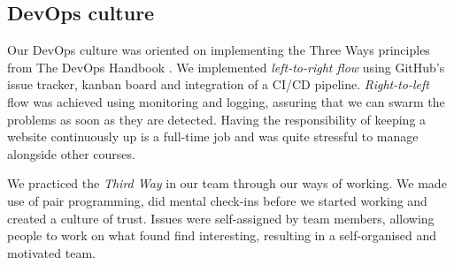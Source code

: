 \subsection{DevOps culture}


Our DevOps culture was oriented on implementing the Three Ways principles from The DevOps Handbook \cite[Chapter~1]{kim2021devops}. We implemented \textit{left-to-right flow} using GitHub's issue tracker, kanban board and integration of a CI/CD pipeline. \textit{Right-to-left} flow was achieved using monitoring and logging, assuring that we can swarm the problems as soon as they are detected. Having the responsibility of keeping a website continuously up is a full-time job and was quite stressful to manage alongside other courses.

We practiced the \textit{Third Way} in our team through our ways of working. We made use of pair programming, did mental check-ins before we started working and created a culture of trust.
Issues were self-assigned by team members, allowing people to work on what found find interesting, resulting in a self-organised and motivated team.

